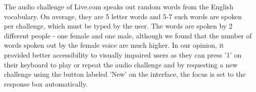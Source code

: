 The audio challenge of Live.com speaks out random words from the English vocabulary. On average, 
they are 5 letter words and 5-7 such words are spoken per challenge, which must be typed by the user. 
The words are spoken by 2 different people - one female and one male, although we found that the number 
of words spoken out by the female voice are much higher. In our opinion, it provided better accessibility 
to visually impaired users as they can press '1' on their keyboard to play or repeat the audio challenge 
and by requesting a new challenge using the button labeled 'New' on the interface, the focus is set to the 
response box automatically.
